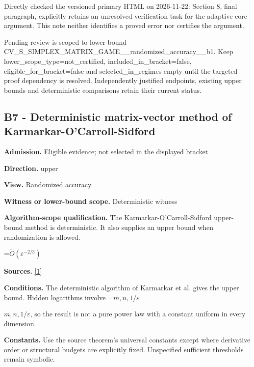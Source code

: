 \documentclass[10pt,a4paper]{article}
\newcommand{\AtlasMath}[1]{\par\begingroup\centering\setbox0=\hbox{$\displaystyle #1$}\ifdim\wd0>1.4\linewidth\typeout{ATLAS WIDE FORMULA: \the\wd0}\fi\ifdim\wd0>\linewidth\resizebox{\linewidth}{!}{\box0}\else\box0\fi\par\endgroup}
\newcommand{\AtlasInlineMath}[1]{\begingroup\setbox0=\hbox{$#1$}\ifdim\wd0>.4\linewidth\endgroup\AtlasMath{#1}\else\endgroup$#1$\fi}
\begin{document}
Directly checked the versioned primary HTML on 2026-11-22: Section 8, final paragraph, explicitly retains an unresolved verification task for the adaptive core argument. This note neither identifies a proved error nor certifies the argument.



Pending review is scoped to lower bound CV\_S\_SIMPLEX\_MATRIX\_GAME\allowbreak{}\_\_randomized\_accuracy\_\_b\allowbreak{}1. Keep lower\_scope\_type=not\_certified, included\_in\_bracket=false, eligible\_for\_bracket=false and selected\_in\_regimes empty until the targeted proof dependency is resolved. Independently justified endpoints, existing upper bounds and deterministic comparisons retain their current status.



\subsection{B7 - Deterministic matrix-vector method of Karmarkar-O’Carroll-Sidford}


\textbf{Admission.} Eligible evidence; not selected in the displayed bracket



\textbf{Direction.} upper



\textbf{View.} Randomized accuracy



\textbf{Witness or lower-bound scope.} Deterministic witness



\textbf{Algorithm-scope qualification.} The Karmarkar-O’Carroll-Sidford upper-bound method is deterministic. It also supplies an upper bound when randomization is allowed.



\AtlasMath{\widetilde{O}(\varepsilon^{-2/3})}


\textbf{Sources.} \href{https://arxiv.org/pdf/2601.02347v3}{[1]}



\textbf{Conditions.} The deterministic algorithm of Karmarkar et al. gives the upper bound. Hidden logarithms involve \AtlasInlineMath{m,n,1/\varepsilon}, so the result is not a pure power law with a constant uniform in every dimension.



\textbf{Constants.} Use the source theorem’s universal constants except where derivative order or structural budgets are explicitly fixed. Unspecified sufficient thresholds remain symbolic.
\end{document}
